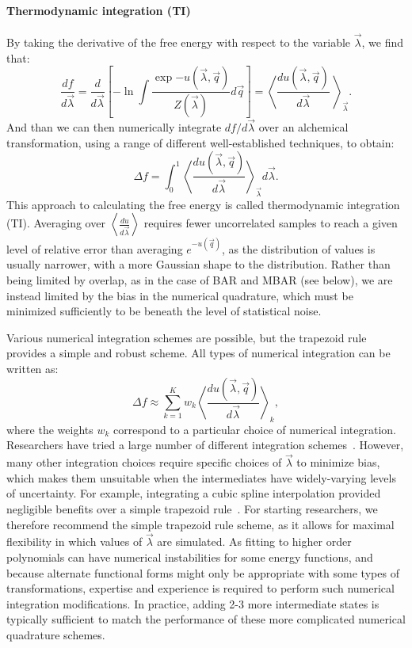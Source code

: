 \documentclass[9pt,bestpractices]{livecoms}
\newcommand{\expect}[1]{\left\langle{#1}\right\rangle}
\begin{document}
\paragraph{Thermodynamic integration (TI)}
By taking the derivative of the free energy with respect to the
variable $\vec{\lambda}$, we find that:
\begin{equation}
\frac{df}{d\vec{\lambda}} = \frac{d}{d\vec{\lambda}} \left[-\ln \int \frac{\exp{-u(\vec{\lambda},\vec{q})}}{Z(\vec{\lambda})} d\vec{q}\right] = \expect{\frac{du(\vec{\lambda},\vec{q})}{d\vec{\lambda}}\
}_{\vec{\lambda}} .
\end{equation}
And than we can then numerically integrate $df/d\vec{\lambda}$ over an alchemical transformation, using a range of different well-established techniques, to obtain:
\begin{equation}
\Delta f    = \int_{0}^{1} \expect{\frac{du(\vec{\lambda},\vec{q})}{d\vec{\lambda}}}_{\vec{\lambda}}  d\vec{\lambda}.    
\end{equation}
This approach to calculating the free energy is called thermodynamic integration (TI). Averaging over $\expect{\frac{du}{d\vec{\lambda}}}$ requires fewer uncorrelated samples to reach a given level of relative error
than averaging $e^{-u(\vec{q})}$, as the distribution of values is usually narrower, with a more Gaussian shape to the distribution. Rather than being limited by overlap, as in the case of BAR and MBAR (see below), we are instead limited by the bias in the numerical quadrature, which must be minimized sufficiently to be beneath the level of statistical noise.

Various numerical integration schemes are possible, but the trapezoid
rule provides a simple and robust scheme. All types of numerical integration can be written as:
\[ \Delta f \approx \sum_{k=1}^{K} w_k
\expect{\frac{du(\vec{\lambda},\vec{q})}{d\vec{\lambda}}}_{k}, \] where the weights $w_k$ correspond to a particular choice of numerical integration.
Researchers have tried a large number of different integration schemes~\cite{resat1993studies,jorge2010effect,shyu2009reducing}. However, many other integration choices require specific choices of $\vec{\lambda}$ to minimize bias, which makes them unsuitable when the intermediates
have widely-varying levels of uncertainty. For example, integrating a cubic spline interpolation provided negligible benefits over a simple trapezoid rule~\cite{paliwal2011benchmark}. For starting researchers, we therefore recommend the simple trapezoid rule scheme, as it allows for maximal flexibility in which values of $\vec{\lambda}$ are simulated. As fitting to higher order polynomials can have numerical instabilities for some energy functions, and because alternate functional forms might only be appropriate with some types of transformations, expertise and experience is required to perform such numerical integration modifications. In practice, adding 2-3 more intermediate states is typically sufficient to match the performance of these more complicated numerical quadrature schemes.
\end{document}
